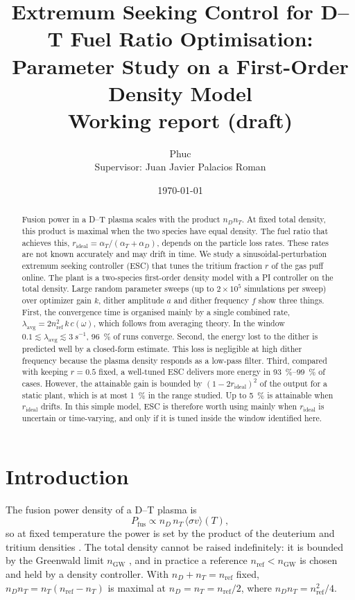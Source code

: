 \documentclass[11pt,a4paper]{article}
\title{Extremum Seeking Control for D--T Fuel Ratio Optimisation:\\
       Parameter Study on a First-Order Density Model\\[0.5ex]
       \large Working report (draft)}
\author{Phuc \todo{full name} \\ Supervisor: Juan Javier Palacios Roman}
\date{\today}
\newcommand{\nD}{n_D}
\newcommand{\nT}{n_T}
\newcommand{\nref}{n_\mathrm{ref}}
\newcommand{\rid}{r_\mathrm{ideal}}
\newcommand{\lavg}{\lambda_\mathrm{avg}}
\begin{document}
\maketitle

\begin{abstract}
Fusion power in a D--T plasma scales with the product $\nD\nT$. At fixed total density, this product is maximal when the two species have equal density. The fuel ratio that achieves this, $\rid=\alpha_T/(\alpha_T+\alpha_D)$, depends on the particle loss rates. These rates are not known accurately and may drift in time.
We study a sinusoidal-perturbation extremum seeking controller (ESC) that tunes the tritium fraction $r$ of the gas puff online. The plant is a two-species first-order density model with a PI controller on the total density.
Large random parameter sweeps (up to $2\times10^5$ simulations per sweep) over optimizer gain $k$, dither amplitude $a$ and dither frequency $f$ show three things. First, the convergence time is organised mainly by a single combined rate, $\lavg = 2\nref^2\,k\,c(\omega)$, which follows from averaging theory. In the window $0.1\lesssim\lavg\lesssim\SI{3}{s^{-1}}$, \SI{96}{\percent} of runs converge. Second, the energy lost to the dither is predicted well by a closed-form estimate. This loss is negligible at high dither frequency because the plasma density responds as a low-pass filter. Third, compared with keeping $r=0.5$ fixed, a well-tuned ESC delivers more energy in \SIrange{93}{99}{\percent} of cases. However, the attainable gain is bounded by $(1-2\rid)^2$ of the output for a static plant, which is at most \SI{1}{\percent} in the range studied. Up to \SI{5}{\percent} is attainable when $\rid$ drifts. In this simple model, ESC is therefore worth using mainly when $\rid$ is uncertain or time-varying, and only if it is tuned inside the window identified here.
\end{abstract}

\tableofcontents

\section{Introduction}

The fusion power density of a D--T plasma is
\begin{equation}
  P_\mathrm{fus} \propto \nD\,\nT\,\langle\sigma v\rangle(T),
\end{equation}
so at fixed temperature the power is set by the product of the deuterium and tritium densities \citep{wesson2004tokamaks}.
The total density cannot be raised indefinitely: it is bounded by the Greenwald limit $n_\mathrm{GW}$ \citep{greenwald2002density}, and in practice a reference $\nref<n_\mathrm{GW}$ is chosen and held by a density controller.
With $\nD+\nT=\nref$ fixed, $\nD\nT=\nT(\nref-\nT)$ is maximal at $\nD=\nT=\nref/2$, where $\nD\nT=\nref^2/4$.
\end{document}
